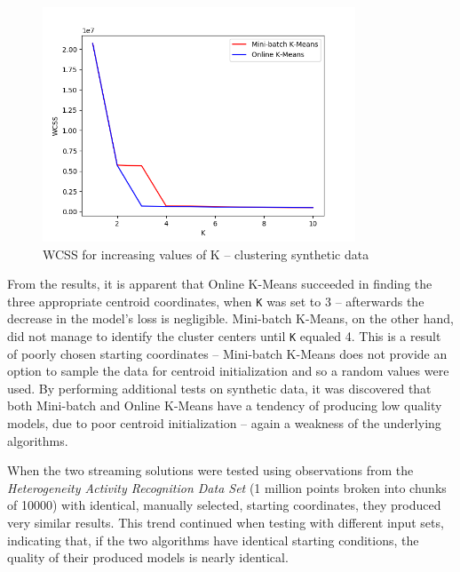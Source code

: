 \documentclass{l4proj}
\begin{document}
\begin{figure}[H]
	\centering
    \label{fig:res10}
    \includegraphics[width=0.83\textwidth]{images/result10}
    \caption{WCSS for increasing values of K -- clustering synthetic data} 
\end{figure}

From the results, it is apparent that Online K-Means succeeded in finding the three appropriate centroid coordinates, when \texttt{K} was set to 3 -- afterwards the decrease in the model's loss is negligible. Mini-batch K-Means, on the other hand, did not manage to identify the cluster centers until \texttt{K} equaled 4. This is a result of poorly chosen starting coordinates -- Mini-batch K-Means does not provide an option to sample the data for centroid initialization and so a random values were used. By performing additional tests on synthetic data, it was discovered that both Mini-batch and Online K-Means have a tendency of producing low quality models, due to poor centroid initialization -- again a weakness of the underlying algorithms.

When the two streaming solutions were tested using observations from the  \textit{Heterogeneity Activity Recognition Data Set} (1 million points broken into chunks of 10000) with identical, manually selected, starting coordinates, they produced very similar results. This trend continued when testing with different input sets, indicating that, if the two algorithms have identical starting conditions, the quality of their produced models is nearly identical.
\end{document}
